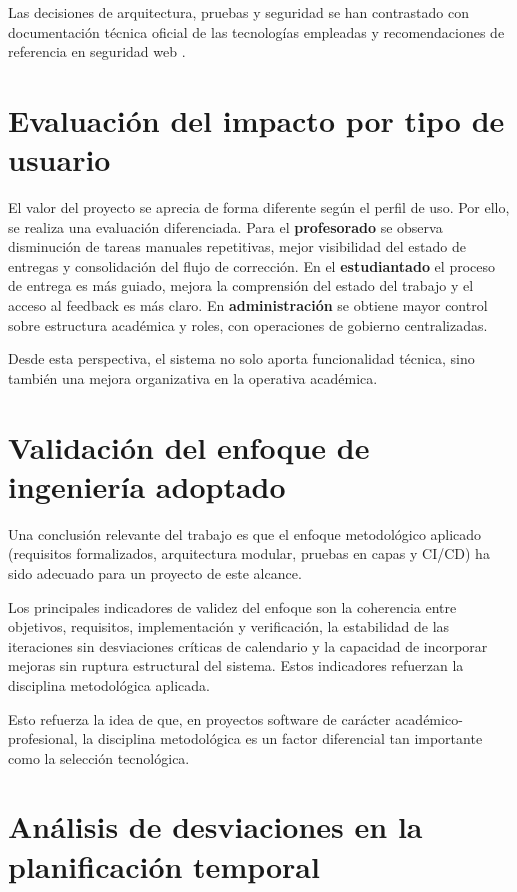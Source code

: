 Las decisiones de arquitectura, pruebas y seguridad se han contrastado
con documentaci\'on t\'ecnica oficial de las tecnolog\'ias empleadas y
recomendaciones de referencia en seguridad web
\cite{springbootdocs,reactdocs,flywaydocs,vitestdocs,playwrightdocs,owasptop10}.

\FloatBarrier
\section{Evaluaci\'on del impacto por tipo de usuario}

El valor del proyecto se aprecia de forma diferente seg\'un el perfil de uso.
Por ello, se realiza una evaluaci\'on diferenciada. Para el \textbf{profesorado} se observa disminuci\'on de tareas manuales repetitivas, mejor visibilidad del estado de entregas y consolidaci\'on del flujo de correcci\'on. En el \textbf{estudiantado} el proceso de entrega es m\'as guiado, mejora la comprensi\'on del estado del trabajo y el acceso al feedback es m\'as claro. En \textbf{administraci\'on} se obtiene mayor control sobre estructura acad\'emica y roles, con operaciones de gobierno centralizadas.

Desde esta perspectiva,
el sistema no solo aporta funcionalidad t\'ecnica,
sino tambi\'en una mejora organizativa en la operativa acad\'emica.

\FloatBarrier
\section{Validaci\'on del enfoque de ingenier\'ia adoptado}

Una conclusi\'on relevante del trabajo es que el enfoque metodol\'ogico aplicado
(requisitos formalizados, arquitectura modular, pruebas en capas y CI/CD)
ha sido adecuado para un proyecto de este alcance.

Los principales indicadores de validez del enfoque son la coherencia entre objetivos, requisitos, implementaci\'on y verificaci\'on, la estabilidad de las iteraciones sin desviaciones cr\'iticas de calendario y la capacidad de incorporar mejoras sin ruptura estructural del sistema. Estos indicadores refuerzan la disciplina metodol\'ogica aplicada.

Esto refuerza la idea de que,
en proyectos software de car\'acter acad\'emico-profesional,
la disciplina metodol\'ogica es un factor diferencial
tan importante como la selecci\'on tecnol\'ogica.

\FloatBarrier
\section{An\'alisis de desviaciones en la planificaci\'on temporal}

